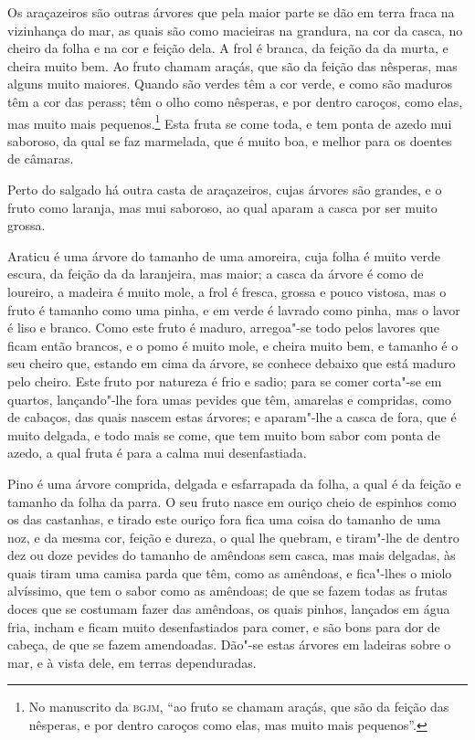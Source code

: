 Os araçazeiros são outras árvores que pela maior parte se dão em terra fraca na vizinhança
do mar, as quais são como macieiras na grandura, na cor da casca, no cheiro da folha e na
cor e feição dela. A frol é branca, da feição da da murta, e cheira muito bem. Ao fruto
chamam araçás, que são da feição das nêsperas, mas alguns muito maiores. Quando são verdes
têm a cor verde, e como são maduros têm a cor das perass; têm o olho como nêsperas, e por
dentro caroços, como elas, mas muito mais pequenos.\footnote{ No manuscrito da
\textsc{bgjm}, ``ao fruto se chamam araçás, que são da feição das nêsperas, e por dentro
caroços como elas, mas muito mais pequenos''.} Esta fruta se come toda, e tem ponta de
azedo mui saboroso, da qual se faz marmelada, que é muito boa, e melhor para os doentes de
câmaras.


Perto do salgado há outra casta de araçazeiros, cujas árvores são grandes, e o fruto como
laranja, mas mui saboroso, ao qual aparam a casca por ser muito grossa.

Araticu é uma árvore do tamanho de uma amoreira, cuja folha é muito verde escura, da
feição da da laranjeira, mas maior; a casca da árvore é como de loureiro, a madeira é
muito mole, a frol é fresca, grossa e pouco vistosa, mas o fruto é tamanho como uma pinha,
e em verde é lavrado como pinha, mas o lavor é liso e branco. Como este fruto é maduro,
arregoa"-se todo pelos lavores que ficam então brancos, e o pomo é muito mole, e cheira
muito bem, e tamanho é o seu cheiro que, estando em cima da árvore, se conhece debaixo que
está maduro pelo cheiro. Este fruto por natureza é frio e sadio; para se comer corta"-se em
quartos, lançando"-lhe fora umas pevides que têm, amarelas e compridas, como de cabaços,
das quais nascem estas árvores; e aparam"-lhe a casca de fora, que é muito delgada, e todo
mais se come, que tem muito bom sabor com ponta de azedo, a qual fruta é para a calma mui
desenfastiada.

Pino é uma árvore comprida, delgada e esfarrapada da folha, a qual é da feição e tamanho
da folha da parra. O seu fruto nasce em ouriço cheio de espinhos como os das castanhas, e
tirado este ouriço fora fica uma coisa do tamanho de uma noz, e da mesma cor, feição e
dureza, o qual lhe quebram, e tiram"-lhe de dentro dez ou doze pevides do tamanho de
amêndoas sem casca, mas mais delgadas, às quais tiram uma camisa parda que têm, como as
amêndoas, e fica"-lhes o miolo alvíssimo, que tem o sabor como as amêndoas; de que se fazem
todas as frutas doces que se costumam fazer das amêndoas, os quais pinhos, lançados em
água fria, incham e ficam muito desenfastiados para comer, e são bons para dor de cabeça,
de que se fazem amendoadas. Dão"-se estas árvores em ladeiras sobre o mar, e à vista dele,
em terras dependuradas.

